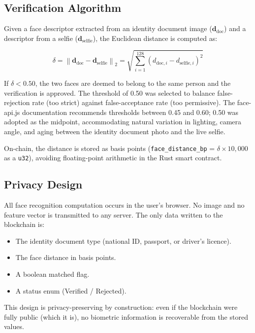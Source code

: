\subsection{Verification Algorithm}

Given a face descriptor extracted from an identity document image ($\mathbf{d}_{\text{doc}}$) and a descriptor from a selfie ($\mathbf{d}_{\text{selfie}}$), the Euclidean distance is computed as:

\begin{equation}
    \delta = \left\| \mathbf{d}_{\text{doc}} - \mathbf{d}_{\text{selfie}} \right\|_2 = \sqrt{\sum_{i=1}^{128} (d_{\text{doc},i} - d_{\text{selfie},i})^2}
\end{equation}

If $\delta < 0.50$, the two faces are deemed to belong to the same person and the verification is approved. The threshold of 0.50 was selected to balance false-rejection rate (too strict) against false-acceptance rate (too permissive). The face-api.js documentation recommends thresholds between 0.45 and 0.60; 0.50 was adopted as the midpoint, accommodating natural variation in lighting, camera angle, and aging between the identity document photo and the live selfie.

On-chain, the distance is stored as basis points (\texttt{face\_distance\_bp} = $\delta \times 10{,}000$ as a \texttt{u32}), avoiding floating-point arithmetic in the Rust smart contract.

\subsection{Privacy Design}

All face recognition computation occurs in the user's browser. No image and no feature vector is transmitted to any server. The only data written to the blockchain is:
\begin{itemize}
    \item The identity document type (national ID, passport, or driver's licence).
    \item The face distance in basis points.
    \item A boolean matched flag.
    \item A status enum (Verified / Rejected).
\end{itemize}

This design is privacy-preserving by construction: even if the blockchain were fully public (which it is), no biometric information is recoverable from the stored values.


